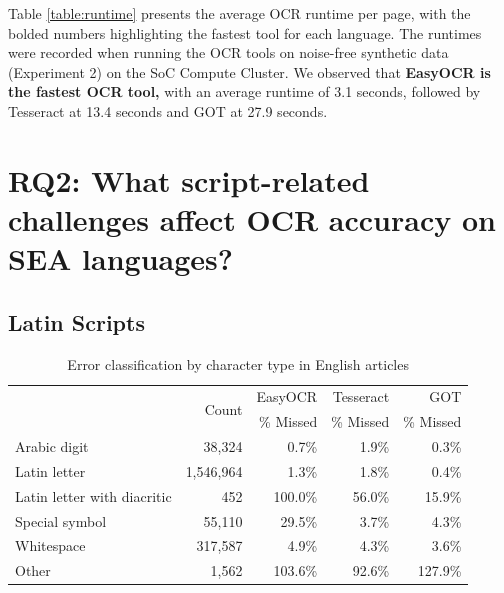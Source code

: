 \documentclass[12pt,oneside]{memoir}
\begin{document}
Table \ref{table:runtime} presents the average OCR runtime per page, with the bolded numbers highlighting the fastest tool for each language. 
The runtimes were recorded when running the OCR tools on noise-free synthetic data (Experiment 2) on the SoC Compute Cluster. 
We observed that \textbf{EasyOCR is the fastest OCR tool,} with an average runtime of 3.1 seconds, followed by Tesseract at 13.4 seconds and GOT at 27.9 seconds.

\section{RQ2: What script-related challenges affect OCR accuracy on SEA languages?}

\subsection{Latin Scripts}

\begin{table}[ht]
    \caption{Error classification by character type in English articles}
    \label{table:error-classification-english}
    \centering
    \begin{tabular}{lrrrr}
        \toprule
        & \multirow{2}{*}{Count} & EasyOCR & Tesseract & GOT\\
        & & \% Missed & \% Missed & \% Missed\\
        \midrule
        Arabic digit & 38,324 & \cellcolor{LightRed!1}0.7\% & \cellcolor{LightRed!2}1.9\% & 0.3\%\\
        Latin letter & 1,546,964 & \cellcolor{LightRed!1}1.3\% & \cellcolor{LightRed!2}1.8\% & 0.4\%\\
        Latin letter with diacritic & 452 & \cellcolor{LightRed!100}100.0\% & \cellcolor{LightRed!56}56.0\% & \cellcolor{LightRed!16}15.9\%\\
        Special symbol & 55,110 & \cellcolor{LightRed!30}29.5\% & \cellcolor{LightRed!4}3.7\% & \cellcolor{LightRed!4}4.3\%\\
        Whitespace & 317,587 & \cellcolor{LightRed!5}4.9\% & \cellcolor{LightRed!4}4.3\% & \cellcolor{LightRed!4}3.6\%\\
        Other & 1,562 & \cellcolor{LightRed!104}103.6\% & \cellcolor{LightRed!93}92.6\% & \cellcolor{LightRed!128}127.9\%\\
        \bottomrule
    \end{tabular}
\end{table}
\end{document}

